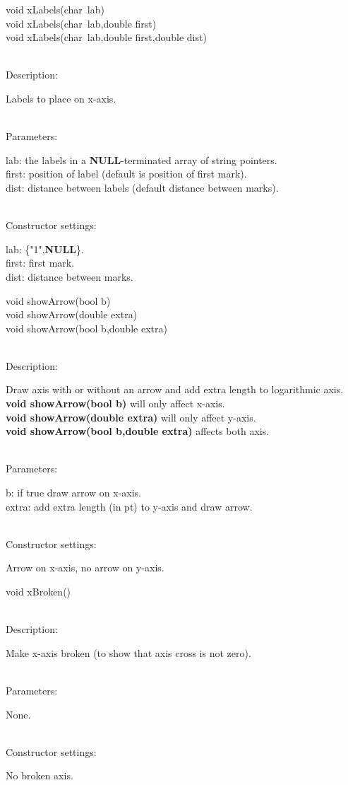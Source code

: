 \documentclass[12pt,a4paper]{article}
\newcommand{\memberitem}[1]{
                              \vspace{-0.5pc}
                              \end{minipage}\\
                              \phantom{M}#1:\\
                              \phantom{MM}
                              \begin{minipage}[t]{12cm}

                           }
\newcommand{\memdsc}{\memberitem{Description}}
\newcommand{\meminp}{\memberitem{Parameters}}
\newcommand{\memdef}{\memberitem{Constructor settings}}
\newenvironment{MemberDescr}
  {
    \begin{minipage}{15cm}
    \bf
  }
  {
    \end{minipage}
  }
\newcommand{\ppntr}{\raisebox{-0.25em}{**}\ }
\begin{document}
  \begin{MemberDescr}
    void xLabels(char\ppntr lab)\\
    void xLabels(char\ppntr lab,double first)\\
    void xLabels(char\ppntr lab,double first,double dist)\\
    \memdsc
      Labels to place on x-axis.\\
    \meminp
      lab:   the labels in a \textbf{NULL}-terminated array of string pointers.\\
      first: position of label (default is position of first mark).\\
      dist:  distance between labels (default distance between marks).\\
    \memdef
      lab: \{"1",\textbf{NULL}\}.\\
      first: first mark.\\
      dist: distance between marks.\\
  \end{MemberDescr}

  \begin{MemberDescr}
    void showArrow(bool b)\\
    void showArrow(double extra)\\
    void showArrow(bool b,double extra)\\
    \memdsc
      Draw axis with or without an arrow and add extra length to logarithmic
      axis.\\

      \textbf{void showArrow(bool b)} will only affect x-axis.\\
      \textbf{void showArrow(double extra)} will only affect y-axis.\\
      \textbf{void showArrow(bool b,double extra)} affects both axis.\\
    \meminp
      b:  if true draw arrow on x-axis.\\
      extra: add extra length (in pt) to y-axis and draw arrow.\\
    \memdef
      Arrow on x-axis, no arrow on y-axis.\\
  \end{MemberDescr}

  \begin{MemberDescr}
    void xBroken()\\
    \memdsc
      Make x-axis broken (to show that axis cross is not zero).\\
    \meminp
      None.\\
    \memdef
      No broken axis.\\
  \end{MemberDescr}
\end{document}
